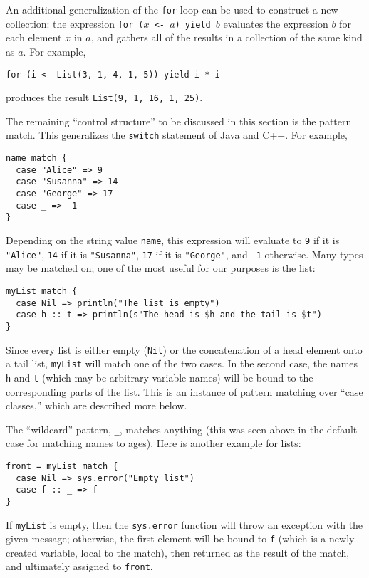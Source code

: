 \documentclass[11pt]{article}
\begin{document}
An additional generalization of the \texttt{for} loop can be used to construct a new collection: the expression \texttt{for ($x$ <- $a$) yield $b$} evaluates the expression $b$ for each element $x$ in $a$, and gathers all of the results in a collection of the same kind as $a$. For example,
\begin{verbatim}
for (i <- List(3, 1, 4, 1, 5)) yield i * i
\end{verbatim}
produces the result \texttt{List(9, 1, 16, 1, 25)}.

The remaining ``control structure'' to be discussed in this section is the pattern match. This generalizes the \texttt{switch} statement of Java and C++. For example,
\begin{verbatim}
name match {
  case "Alice" => 9
  case "Susanna" => 14
  case "George" => 17
  case _ => -1
}
\end{verbatim}
Depending on the string value \texttt{name}, this expression will evaluate to \texttt{9} if it is \texttt{"Alice"}, \texttt{14} if it is \texttt{"Susanna"}, \texttt{17} if it is \texttt{"George"}, and \texttt{-1} otherwise. Many types may be matched on; one of the most useful for our purposes is the list:
\begin{verbatim}
myList match {
  case Nil => println("The list is empty")
  case h :: t => println(s"The head is $h and the tail is $t")
}
\end{verbatim}
Since every list is either empty (\texttt{Nil}) or the concatenation of a head element onto a tail list, \texttt{myList} will match one of the two cases. In the second case, the names \texttt{h} and \texttt{t} (which may be arbitrary variable names) will be bound to the corresponding parts of the list. This is an instance of pattern matching over ``case classes,'' which are described more below.

The ``wildcard'' pattern, \verb|_|, matches anything (this was seen above in the default case for matching names to ages). Here is another example for lists:
\begin{verbatim}
front = myList match {
  case Nil => sys.error("Empty list")
  case f :: _ => f
}
\end{verbatim}
If \texttt{myList} is empty, then the \texttt{sys.error} function will throw an exception with the given message; otherwise, the first element will be bound to \texttt{f} (which is a newly created variable, local to the match), then returned as the result of the match, and ultimately assigned to \texttt{front}.
\end{document}
